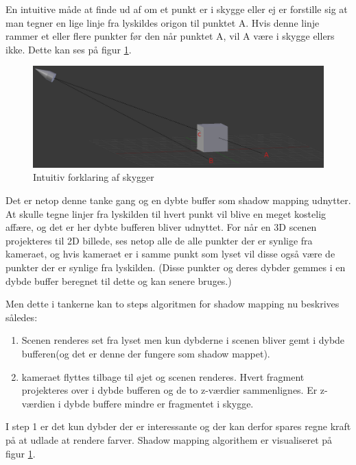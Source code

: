\documentclass[11pt,a4paper]{article}
\begin{document}
En intuitive måde at finde ud af om et punkt er i skygge eller ej er forstille sig at man tegner en lige linje fra lyskildes origon til punktet A. Hvis denne linje rammer et eller flere punkter før den når punktet A, vil A være i  skygge ellers ikke. Dette kan ses på figur \ref{shadowdesc}.

\begin{figure}[ht!]
\centering
\includegraphics[width=120mm]{img/1.png}
\caption{Intuitiv forklaring af skygger}
\label{shadowdesc}
\end{figure}

Det er netop denne tanke gang og en dybte buffer som shadow mapping udnytter. At skulle tegne linjer fra lyskilden til hvert punkt vil blive en meget kostelig affære, og det er her dybte bufferen bliver udnyttet. For når en 3D scenen projekteres til 2D billede, ses netop alle de alle punkter der er synlige fra kameraet, og hvis kameraet er i samme punkt som lyset vil disse også være de punkter der er synlige fra lyskilden. (Disse punkter og deres dybder gemmes i en dybde buffer beregnet til dette og kan senere bruges.)

Men dette i tankerne kan to steps algoritmen for shadow mapping nu beskrives således:
\begin{enumerate}
\item Scenen renderes set fra lyset men kun dybderne i scenen bliver gemt i dybde bufferen(og det er denne der fungere som shadow mappet).
\item kameraet flyttes tilbage til øjet og scenen renderes. Hvert fragment projekteres over i dybde bufferen og de to z-værdier sammenlignes. Er z-værdien i dybde buffere mindre er fragmentet i skygge.
\end{enumerate}

I step 1 er det kun dybder der er interessante og der kan derfor spares regne kraft på at udlade at rendere farver. Shadow mapping algorithem er visualiseret på figur \ref{shadowdesc}.
\end{document}
